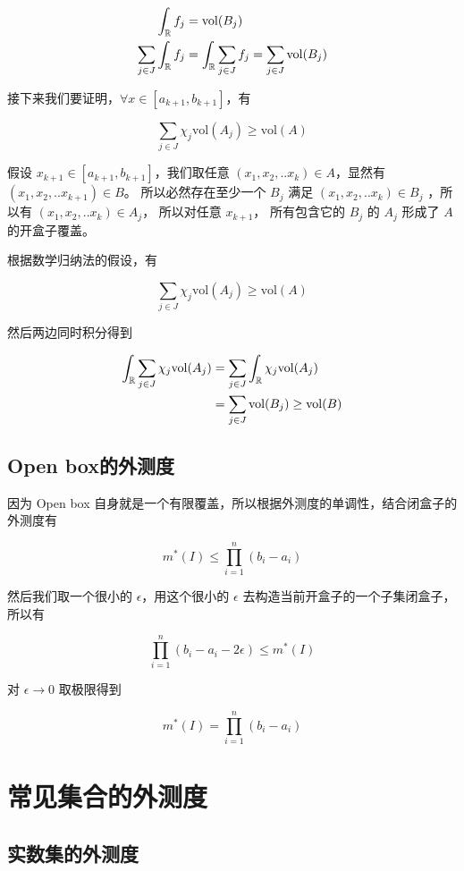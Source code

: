 \begin{align*}
    \int_{\mathbb{R}} f_j &= \mathrm{vol}(B_j) \\
    \sum_{j \in J} \int_{\mathbb{R}} f_j &=  \int_{\mathbb{R}}\sum_{j \in J} f_j = \sum_{j \in J} \mathrm{vol}(B_j)
\end{align*}


接下来我们要证明，$\forall x \in [a_{k+1}, b_{k+1}]$，有

\[
\sum_{j \in J} \chi_j \mathrm{vol}(A_j) \ge \mathrm{vol}(A)
\]

假设 $x_{k+1} \in [a_{k+1}, b_{k+1}]$，我们取任意 $(x_1, x_2, .. x_k) \in A$，显然有 $(x_1, x_2, .. x_{k+1}) \in B$。
所以必然存在至少一个 $B_j$ 满足 $(x_1, x_2, .. x_k) \in B_j$ ，所以有 $(x_1, x_2, .. x_k) \in A_j$，
所以对任意 $x_{k+1}$， 所有包含它的 $B_j$ 的 $A_j$ 形成了 $A$ 的开盒子覆盖。

根据数学归纳法的假设，有


\[
\sum_{j \in J} \chi_j \mathrm{vol}(A_j) \ge \mathrm{vol}(A)
\]

然后两边同时积分得到

\begin{align*}
    \int_{\mathbb{R}} \sum_{j \in J} \chi_j \mathrm{vol}(A_j) &= \sum_{j \in J}\int_{\mathbb{R}} \chi_j \mathrm{vol}(A_j) \\
    &= \sum_{j \in J}\mathrm{vol}(B_j) \ge \mathrm{vol}(B)
\end{align*}

\subsection{Open box的外测度}

因为 Open box 自身就是一个有限覆盖，所以根据外测度的单调性，结合闭盒子的外测度有


\[
m^*(I) \le \prod_{i=1}^{n}(b_i - a_i)
\]

然后我们取一个很小的 $\epsilon$，用这个很小的 $\epsilon$ 去构造当前开盒子的一个子集闭盒子，所以有

\[
\prod_{i=1}^{n}(b_i - a_i - 2\epsilon) \le m^*(I)
\]

对 $\epsilon \to 0$ 取极限得到

\[
m^*(I) = \prod_{i=1}^{n}(b_i - a_i)
\]

\section{常见集合的外测度}

\subsection{实数集的外测度}


